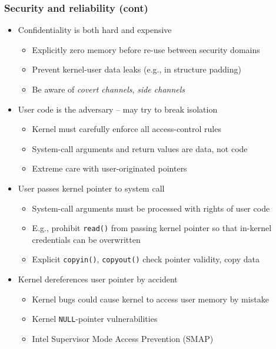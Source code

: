 \begin{frame}
  \frametitle{Security and reliability (cont)}

  \begin{itemize}
    \item Confidentiality is both hard and expensive
    \begin{itemize}
      \item Explicitly zero memory before re-use between security domains
      \item Prevent kernel-user data leaks (e.g., in structure padding)
      \item Be aware of \textit{covert channels}, \textit{side channels}
    \end{itemize}

    \pause
    \medskip

    \item User code is the adversary -- may try to break isolation
    \begin{itemize}
      \item Kernel must carefully enforce all access-control rules
      \item System-call arguments and return values are data, not code
      \item Extreme care with user-originated pointers
    \end{itemize}

    \pause
    \medskip

    \item User passes kernel pointer to system call
    \begin{itemize}
      \item System-call arguments must be processed with rights of user code

      \pause
      \smallskip

      \item E.g., prohibit \texttt{read()} from passing kernel pointer so
	that in-kernel credentials can be overwritten
      \item Explicit \texttt{copyin()}, \texttt{copyout()} check pointer
	validity, copy data
    \end{itemize}

    \pause
    \medskip

    \item Kernel dereferences user pointer by accident
    \begin{itemize}
      \item Kernel bugs could cause kernel to access user memory by mistake

      \pause
      \smallskip

      \item Kernel \texttt{NULL}-pointer vulnerabilities
      \item Intel Supervisor Mode Access Prevention (SMAP)
    \end{itemize}
  \end{itemize}
\end{frame}

